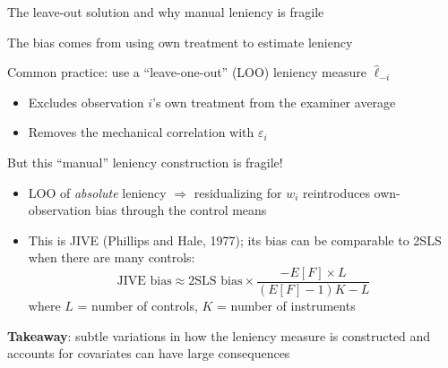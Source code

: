 \documentclass[notes,11pt, aspectratio=169]{beamer}
\newenvironment{wideitemize}{\itemize\addtolength{\itemsep}{10pt}}{\enditemize}
\begin{document}
\begin{frame}{The leave-out solution and why manual leniency is fragile}
  \begin{wideitemize}
  \item The bias comes from using own treatment to estimate leniency
  \item Common practice: use a ``leave-one-out'' (LOO) leniency measure $\hat{\ell}_{-i}$
    \begin{itemize}
    \item Excludes observation $i$'s own treatment from the examiner average
    \item Removes the mechanical correlation with $\varepsilon_{i}$
    \end{itemize}
  \item But this ``manual'' leniency construction is fragile!
    \begin{itemize}
    \item LOO of \emph{absolute} leniency $\Rightarrow$ residualizing for $w_{i}$ reintroduces own-observation bias through the control means
    \item This is JIVE (Phillips and Hale, 1977); its bias can be comparable to 2SLS when there are many controls:
      \begin{equation*}
        \text{JIVE bias} \approx \text{2SLS bias} \times \frac{-E[F] \times L}{(E[F]-1)K - L}
      \end{equation*}
      where $L$ = number of controls, $K$ = number of instruments
    \end{itemize}
  \item \textbf{Takeaway}: subtle variations in how the leniency measure is constructed and accounts for covariates can have large consequences
  \end{wideitemize}
\end{frame}
\end{document}
